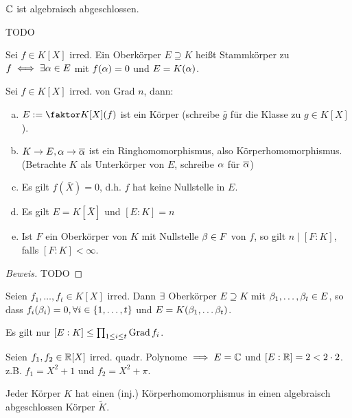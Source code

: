 \documentclass[a4paper]{report}
\begin{document}
\begin{bsp*}
  \item $\mathbb{C}$ ist algebraisch abgeschlossen.
  \item TODO
\end{bsp*}
\begin{defi}
Sei $f \in K[X]$ irred. Ein Oberkörper $E \supseteq K$ heißt Stammkörper zu $f \iff \exists \alpha \in E$ mit $f(\alpha) = 0$ und $E = K(\alpha)$.
\end{defi}

\begin{satz}
  Sei $f \in K[X]$ irred. von Grad $n$, dann:
  \begin{enumerate}[(a)]
    \item $E:= \fak{K[X]}{(f)}$ ist ein Körper (schreibe $\bar g$ für die Klasse zu $g \in K[X]$).
    \item $K \to E, \alpha \to \overline {\alpha}$ ist ein Ringhomomorphismus, also Körperhomomorphismus. (Betrachte $K$ als Unterkörper von $E$, schreibe $\alpha$ für $\overline {\alpha}$)
    \item Es gilt $f(\bar X) = 0$, d.h. $f$ hat keine Nullstelle in $E$.
    \item Es gilt $E = K[\bar X]$ und $[E : K] = n$
    \item Ist $F$ ein Oberkörper von $K$ mit Nullstelle $\beta \in F$ von $f$, so gilt $n \mid [F: K]$, falls $[F : K] < \infty$.
  \end{enumerate}
\begin{proof}[Beweis]
TODO
\end{proof}
\end{satz}

\begin{kor}
  Seien $f_{1}, \ldots, f_{t} \in K[X]$ irred. Dann $\exists$ Oberkörper $E \supseteq K$ mit $\beta_{1}, \ldots, \beta_{t} \in E$, so dass $f_{i}(\beta_{i}) = 0, \forall i \in \{1, \ldots, t\}$ und $E = K(\beta_{1}, \ldots \beta_{t})$.
\end{kor}
\begin{bem*}
Es gilt nur $[E : K] \le \prod_{1 \le i \le t} \operatorname{Grad} f_{i}$.
\end{bem*}
\begin{bsp*}
Seien $f_{1}, f_{2} \in \mathbb{R}[X]$ irred. quadr. Polynome $\implies E = \mathbb{C}$ und $[E : \mathbb{R}] = 2 < 2 \cdot 2$. z.B. $f_{1} = X^{2}+1$ und $f_{2} = X^{2} + \pi$.
\end{bsp*}

\begin{satz}
Jeder Körper $K$ hat einen (inj.) Körperhomomorphismus in einen algebraisch abgeschlossen Körper $\tilde K$.
\end{satz}
\end{document}
